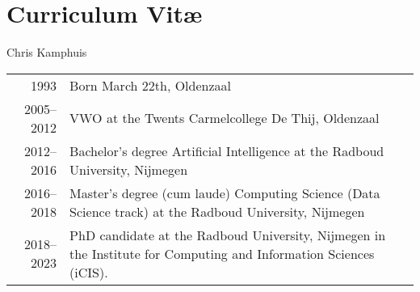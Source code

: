 \chapter*{Curriculum Vit\ae}

Chris Kamphuis

\vspace{\baselineskip}

\noindent%
\begin{tabular}{rp{.75\linewidth}}
	1993         & Born March 22th, Oldenzaal\\
	2005{--}2012 & VWO at the Twents Carmelcollege De Thij, Oldenzaal\\
	2012{--}2016 & Bachelor's degree Artificial Intelligence at the Radboud University, Nijmegen\\
	2016{--}2018 & Master's degree (cum laude) Computing Science (Data Science track) at the Radboud University, Nijmegen\\
	2018{--}2023 & PhD candidate at the Radboud University, Nijmegen in the Institute for Computing and Information Sciences (iCIS).
\end{tabular}